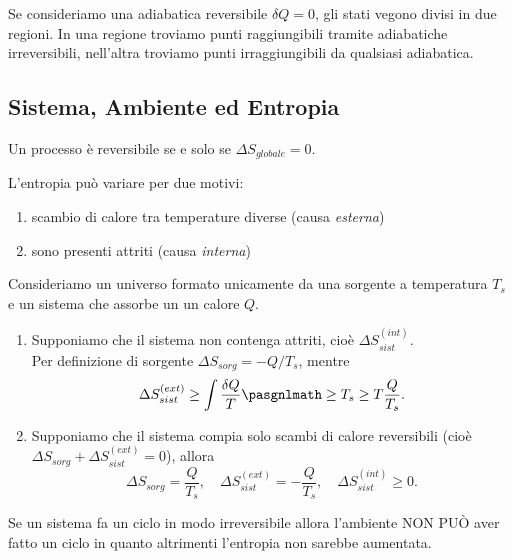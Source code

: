 \begin{remark}
Se consideriamo una adiabatica reversibile $\delta Q=0$, gli stati vegono divisi in due regioni. In una regione troviamo punti raggiungibili tramite adiabatiche irreversibili, nell'altra troviamo punti irraggiungibili da qualsiasi adiabatica.
\end{remark}


\subsection{Sistema, Ambiente ed Entropia}

\begin{remark}
Un processo \`e reversibile se e solo se $\Delta S_{globale}=0$.
\end{remark}

\noindent
L'entropia pu\`o variare per due motivi: 
\begin{enumerate}
\item scambio di calore tra temperature diverse (causa \textit{esterna})
\item sono presenti attriti (causa \textit{interna})
\end{enumerate}

\begin{example}
Consideriamo un universo formato unicamente da una sorgente a temperatura $T_s$ e un sistema che assorbe un un calore $Q$.
\begin{enumerate}
\item Supponiamo che il sistema non contenga attriti, cio\`e $\Delta S_{sist}^{(int)}$.\\ 
Per definizione di sorgente $\Delta S_{sorg}=-Q/T_s$, mentre
\[\Delta S_{sist}^{(ext)}\geq \int \frac{\delta Q}T\pasgnlmath\geq{T_s\geq T} \frac Q{T_s}.\]
\item Supponiamo che il sistema compia solo scambi di calore reversibili (cio\`e $\Delta S_{sorg}+\Delta S_{sist}^{(ext)}=0$), allora
\[\Delta S_{sorg}=\frac Q{T_s},\quad \Delta S_{sist}^{(ext)}=-\frac Q{T_s},\quad \Delta S_{sist}^{(int)}\geq 0.\]
\end{enumerate}
\end{example}


\begin{remark}
Se un sistema fa un ciclo in modo irreversibile allora l'ambiente NON PU\`O aver fatto un ciclo in quanto altrimenti l'entropia non sarebbe aumentata.
\end{remark}


